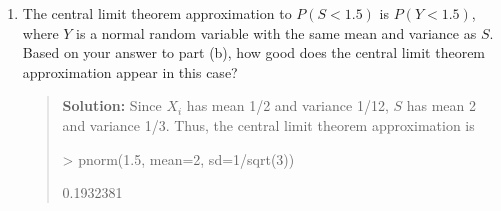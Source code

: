 \documentclass{article}
\begin{document}
\begin{enumerate}
\begin{enumerate}
    \item The central limit theorem approximation to $P(S<1.5)$ is $P(Y<1.5)$,
    where $Y$ is a normal random variable with the same mean and variance as
    $S$. Based on your answer to part (b), how good does the central limit
    theorem approximation appear in this case?
    \begin{quotation}{\bf Solution:}
    Since $X_i$ has mean 1/2 and variance 1/12, $S$ has mean 2 and variance 
    1/3.  Thus, the central limit theorem approximation is 
\begin{Schunk}
\begin{Sinput}
> pnorm(1.5, mean=2, sd=1/sqrt(3))
\end{Sinput}
\begin{Soutput}
[1] 0.1932381
\end{Soutput}
\end{Schunk}
    \end{quotation}
        
    \end{enumerate}

\end{enumerate}
\end{document}
